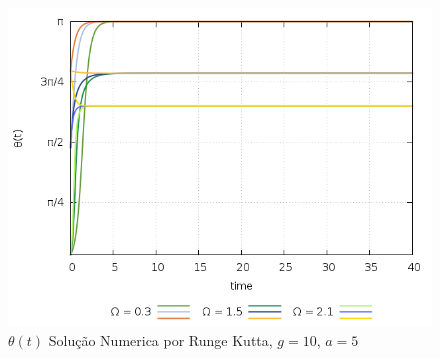 \documentclass[a4paper,11pt]{exam}
\begin{document}
	\begin{figure}[h]
		\centering
		\includegraphics[scale=0.5]{Gr1.png}
		\caption{ $\theta(t)$ Solução Numerica por Runge Kutta, $g=10$, $a=5$}
	\end{figure}
	
\end{document}
